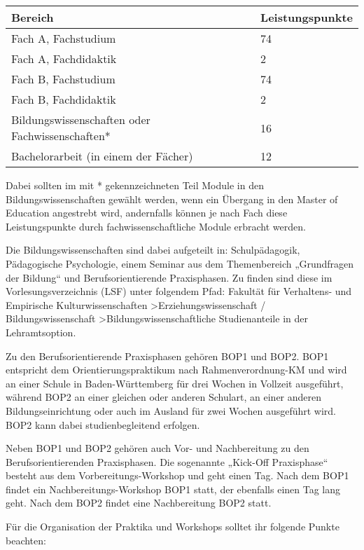 \begin{table*}[htb]
	\centering

	\begin{tabular}{ll}
		\toprule
		Bereich & Leistungspunkte\\
		\midrule
		Fach A, Fachstudium & 74\\
		Fach A, Fachdidaktik & \phantom{0}2\\
		\addlinespace
		Fach B, Fachstudium & 74\\
		Fach B, Fachdidaktik & \phantom{0}2\\
		\addlinespace
		Bildungswissenschaften oder Fachwissenschaften* & 16\\
		\addlinespace
		Bachelorarbeit (in einem der Fächer) & 12\\
		\bottomrule
	\end{tabular}

\end{table*}
Dabei sollten im mit * gekennzeichneten Teil Module in den Bildungswissenschaften gewählt werden, wenn ein Übergang in den Master of Education angestrebt wird, andernfalls können je nach Fach diese Leistungspunkte durch fachwissenschaftliche Module erbracht werden.

Die Bildungswissenschaften sind dabei aufgeteilt in: Schulpädagogik, Pädagogische Psychologie, einem Seminar aus dem Themenbereich „Grundfragen der Bildung“ und Berufsorientierende Praxisphasen. Zu finden sind diese im Vorlesungsverzeichnis (LSF) unter folgendem Pfad:
Fakultät für Verhaltens- und Empirische Kulturwissenschaften >Erziehungswissenschaft /  Bildungswissenschaft >Bildungswissenschaftliche Studienanteile in der Lehramtsoption.


Zu den Berufsorientierende Praxisphasen gehören BOP1 und BOP2. BOP1 entspricht dem Orientierungspraktikum nach Rahmenverordnung-KM und wird an einer Schule in Baden-Württemberg für drei Wochen in Vollzeit ausgeführt, während BOP2 an einer gleichen oder anderen Schulart, an einer anderen Bildungseinrichtung oder auch im Ausland für zwei Wochen ausgeführt wird. BOP2 kann dabei studienbegleitend erfolgen.

Neben BOP1 und BOP2 gehören auch Vor- und Nachbereitung zu den Berufsorientierenden Praxisphasen. Die sogenannte „Kick-Off Praxisphase“ besteht aus dem Vorbereitungs-Workshop und geht einen Tag. Nach dem BOP1 findet ein Nachbereitungs-Workshop BOP1 statt, der ebenfalls einen Tag lang geht. Nach dem BOP2 findet eine Nachbereitung BOP2 statt.

Für die Organisation der Praktika und Workshops solltet ihr folgende Punkte beachten: 

